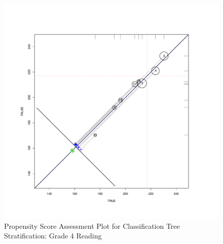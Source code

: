 \clearpage
\begin{figure}
\begin{center}
\includegraphics[height=.4\textheight,width=.4\textheight]{../Figures2009/g4read-circpsa-tree.pdf}
\caption{Propensity Score Assessment Plot for Classification Tree Stratification: Grade 4 Reading}
\end{center}
\end{figure}



